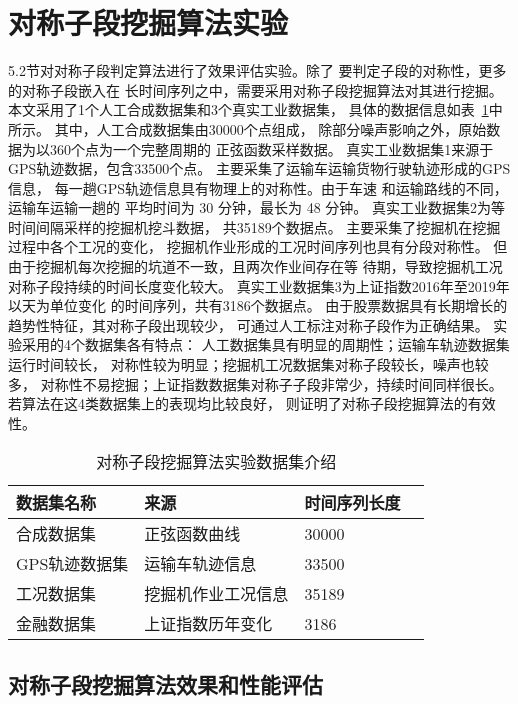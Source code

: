 \section{对称子段挖掘算法实验}

5.2节对对称子段判定算法进行了效果评估实验。除了
要判定子段的对称性，更多的对称子段嵌入在
长时间序列之中，需要采用对称子段挖掘算法对其进行挖掘。
本文采用了1个人工合成数据集和3个真实工业数据集，
具体的数据信息如表~\ref{tab:segment_dataset}中所示。
其中，人工合成数据集由30000个点组成，
除部分噪声影响之外，原始数据为以360个点为一个完整周期的
正弦函数采样数据。
真实工业数据集1来源于GPS轨迹数据，包含33500个点。
主要采集了运输车运输货物行驶轨迹形成的GPS信息，
每一趟GPS轨迹信息具有物理上的对称性。由于车速
和运输路线的不同，运输车运输一趟的
平均时间为 30 分钟，最长为 48 分钟。
真实工业数据集2为等时间间隔采样的挖掘机挖斗数据，
共35189个数据点。
主要采集了挖掘机在挖掘过程中各个工况的变化，
挖掘机作业形成的工况时间序列也具有分段对称性。
但由于挖掘机每次挖掘的坑道不一致，且两次作业间存在等
待期，导致挖掘机工况对称子段持续的时间长度变化较大。
真实工业数据集3为上证指数2016年至2019年以天为单位变化
的时间序列，共有3186个数据点。
由于股票数据具有长期增长的趋势性特征，其对称子段出现较少，
可通过人工标注对称子段作为正确结果。
实验采用的4个数据集各有特点：
人工数据集具有明显的周期性；运输车轨迹数据集运行时间较长，
对称性较为明显；挖掘机工况数据集对称子段较长，噪声也较多，
对称性不易挖掘；上证指数数据集对称子子段非常少，持续时间同样很长。
若算法在这4类数据集上的表现均比较良好，
则证明了对称子段挖掘算法的有效性。

\begin{table}
  \centering
  \caption{对称子段挖掘算法实验数据集介绍}
  \begin{tabular}{llll}
    \toprule
    数据集名称    & 来源               & 时间序列长度 \\
    \midrule
    合成数据集    & 正弦函数曲线       & 30000        \\
    GPS轨迹数据集 & 运输车轨迹信息     & 33500        \\
    工况数据集    & 挖掘机作业工况信息 & 35189        \\
    金融数据集    & 上证指数历年变化   & 3186         \\
    \bottomrule
  \end{tabular}
  \label{tab:segment_dataset}
\end{table}

\subsection{对称子段挖掘算法效果和性能评估}

